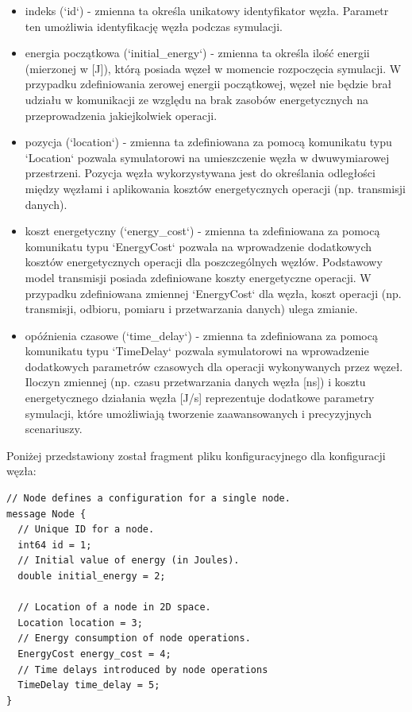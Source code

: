 \documentclass[a4paper,12pt,twoside,openany]{report}
\begin{document}
\begin{itemize}
 \item indeks (`id`) - zmienna ta określa unikatowy identyfikator węzła. Parametr ten umożliwia identyfikację węzła podczas symulacji.
 \item energia początkowa (`initial\_energy`) - zmienna ta określa ilość energii (mierzonej w [J]), którą posiada węzeł w momencie rozpoczęcia symulacji.
       W przypadku zdefiniowania zerowej energii początkowej, węzeł nie będzie brał udziału w komunikacji ze względu na brak zasobów energetycznych na
       przeprowadzenia jakiejkolwiek operacji.
 \item pozycja (`location`) - zmienna ta zdefiniowana za pomocą komunikatu typu `Location` pozwala symulatorowi na umieszczenie węzła w dwuwymiarowej przestrzeni.
       Pozycja węzła wykorzystywana jest do określania odległości między węzłami i aplikowania kosztów energetycznych operacji (np. transmisji danych).
 \item koszt energetyczny (`energy\_cost`) - zmienna ta zdefiniowana za pomocą komunikatu typu `EnergyCost` pozwala na wprowadzenie dodatkowych kosztów energetycznych
       operacji dla poszczególnych węzłów. Podstawowy model transmisji posiada zdefiniowane koszty energetyczne operacji.
       W przypadku zdefiniowana zmiennej `EnergyCost` dla węzła, koszt operacji (np. transmisji, odbioru, pomiaru i przetwarzania danych) ulega zmianie.
 \item opóźnienia czasowe (`time\_delay`) - zmienna ta zdefiniowana za pomocą komunikatu typu `TimeDelay` pozwala symulatorowi na wprowadzenie dodatkowych parametrów czasowych
       dla operacji wykonywanych przez węzeł. Iloczyn zmiennej (np. czasu przetwarzania danych węzła [ns]) i kosztu energetycznego działania węzła [J/s] 
       reprezentuje dodatkowe parametry symulacji, które umożliwiają tworzenie zaawansowanych i precyzyjnych scenariuszy.
\end{itemize}

Poniżej przedstawiony został fragment pliku konfiguracyjnego dla konfiguracji węzła:

\begin{lstlisting}
// Node defines a configuration for a single node.
message Node {
  // Unique ID for a node.
  int64 id = 1;
  // Initial value of energy (in Joules). 
  double initial_energy = 2;

  // Location of a node in 2D space.
  Location location = 3;
  // Energy consumption of node operations.
  EnergyCost energy_cost = 4;
  // Time delays introduced by node operations
  TimeDelay time_delay = 5;
}
\end{lstlisting}
\end{document}
